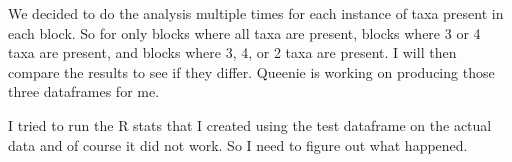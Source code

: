 \documentclass[12pt]{article}
\newcommand{\smel}{\textit{S.\,meliloti}\xspace}
\newcommand{\strep}{\textit{Streptomyces}\xspace}
\newcommand{\bass}{\textit{B.\,subtilis}\xspace}
\newcommand{\ecol}{\textit{E.\,coli}\xspace}
\providecommand{\e}[1]{\ensuremath{\times 10^{#1}}}
\begin{document}
We decided to do the analysis multiple times for each instance of taxa present in each block.
So for only blocks where all taxa are present, blocks where 3 or 4 taxa are present, and blocks where 3, 4, or 2 taxa are present.
I will then compare the results to see if they differ.
Queenie is working on producing those three dataframes for me.

I tried to run the R stats that I created using the test dataframe on the actual data and of course it did not work.
So I need to figure out what happened.




%
%		
\end{document}
